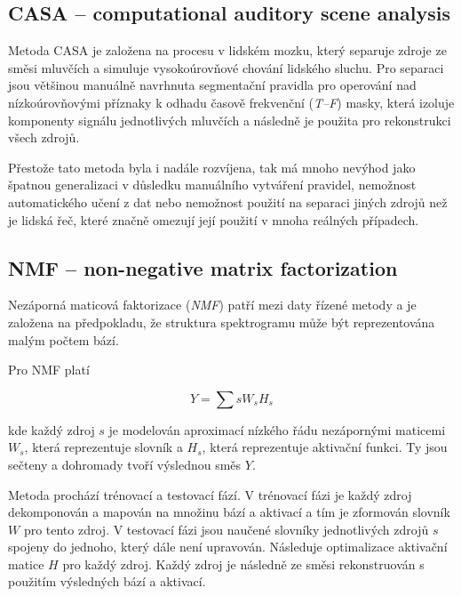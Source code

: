 \subsection{CASA -- computational auditory scene analysis}
Metoda CASA je založena na procesu v lidském mozku, který separuje zdroje ze směsi mluvčích a simuluje vysokoúrovňové chování lidského sluchu. Pro separaci jsou většinou manuálně navrhnuta segmentační pravidla pro operování nad nízkoúrovňovými příznaky k odhadu časově frekvenční (\textit{T--F}) masky, která izoluje komponenty signálu jednotlivých mluvčích a následně je použita pro rekonstrukci všech zdrojů.

Přestože tato metoda byla i nadále rozvíjena, tak má mnoho nevýhod jako špatnou generalizaci v důsledku manuálního vytváření pravidel, nemožnost automatického učení z dat nebo nemožnost použití na separaci jiných zdrojů než je lidská řeč, které značně omezují její použití v mnoha reálných případech.



\subsection{NMF -- non-negative matrix factorization}
Nezáporná maticová faktorizace (\textit{NMF})  patří mezi daty řízené metody a je založena na předpokladu, že struktura spektrogramu může být reprezentována malým počtem bází.

Pro NMF platí

\begin{equation}
  Y = \sum{s}W_sH_s
\end{equation}

kde každý zdroj $s$ je modelován aproximací nízkého řádu nezápornými maticemi $W_s$, která reprezentuje slovník a $H_s$, která reprezentuje aktivační funkci. Ty jsou sečteny a dohromady tvoří výslednou směs $Y$.

Metoda prochází trénovací a testovací fází.
V trénovací fázi je každý zdroj dekomponován a mapován na množinu bází a aktivací a tím je zformován slovník $W$ pro tento zdroj.
V testovací fázi jsou naučené slovníky jednotlivých zdrojů $s$ spojeny do jednoho, který dále není upravován. Následuje optimalizace aktivační matice $H$ pro každý zdroj. Každý zdroj je následně ze směsi rekonstruován s použitím výsledných bází a aktivací.

